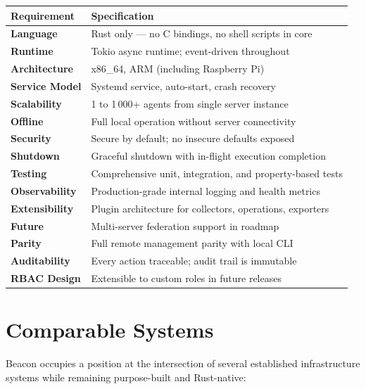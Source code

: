 \documentclass[12pt,a4paper]{article}
\begin{document}
\begin{center}
\begin{tabularx}{\textwidth}{lX}
\toprule
Requirement & Specification \\
\midrule
\textbf{Language}        & Rust only — no C bindings, no shell scripts in core \\
\textbf{Runtime}         & Tokio async runtime; event-driven throughout \\
\textbf{Architecture}    & x86\_64, ARM (including Raspberry Pi) \\
\textbf{Service Model}   & Systemd service, auto-start, crash recovery \\
\textbf{Scalability}     & 1 to 1\,000+ agents from single server instance \\
\textbf{Offline}         & Full local operation without server connectivity \\
\textbf{Security}        & Secure by default; no insecure defaults exposed \\
\textbf{Shutdown}        & Graceful shutdown with in-flight execution completion \\
\textbf{Testing}         & Comprehensive unit, integration, and property-based tests \\
\textbf{Observability}   & Production-grade internal logging and health metrics \\
\textbf{Extensibility}   & Plugin architecture for collectors, operations, exporters \\
\textbf{Future}          & Multi-server federation support in roadmap \\
\textbf{Parity}          & Full remote management parity with local CLI \\
\textbf{Auditability}    & Every action traceable; audit trail is immutable \\
\textbf{RBAC Design}     & Extensible to custom roles in future releases \\
\bottomrule
\end{tabularx}
\end{center}

\section{Comparable Systems}

Beacon occupies a position at the intersection of several established infrastructure systems while remaining purpose-built and Rust-native:
\end{document}
